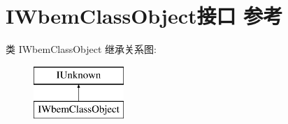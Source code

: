 \hypertarget{interface_i_wbem_class_object}{}\section{I\+Wbem\+Class\+Object接口 参考}
\label{interface_i_wbem_class_object}
类 I\+Wbem\+Class\+Object 继承关系图\+:\begin{figure}[H]
\begin{center}
\leavevmode
\includegraphics[height=2.000000cm]{interface_i_wbem_class_object}
\end{center}
\end{figure}
